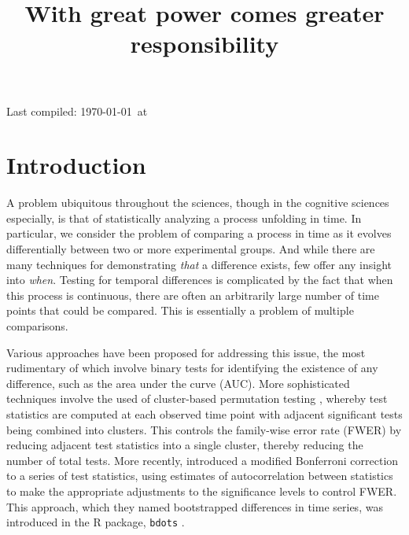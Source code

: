 \documentclass{article}
\title{With great power comes greater responsibility}
\date{}
\newcommand{\xt}{\texttt}
\begin{document}

\maketitle

Last compiled: \today \  at \currenttime


%


\section{Introduction}

A problem ubiquitous throughout the sciences, though in the cognitive sciences especially, is that of statistically analyzing a process unfolding in time. In particular, we consider the problem of comparing a process in time as it evolves differentially between two or more experimental groups. And while there are many techniques for demonstrating \textit{that} a difference exists, few offer any insight into \textit{when}. Testing for temporal differences is complicated by the fact that when this process is continuous, there are often an arbitrarily large number of time points that could be compared. This is essentially a problem of multiple comparisons.

Various approaches have been proposed for addressing this issue, the most rudimentary of which involve binary tests for identifying the existence of any difference, such as the area under the curve (AUC).  More sophisticated techniques involve the used of cluster-based permutation testing \citep{Maris2007}, whereby test statistics are computed at each observed time point with adjacent significant tests being combined into clusters. This controls the family-wise error rate (FWER) by reducing adjacent test statistics into a single cluster, thereby reducing the number of total tests. More recently, \citet{oleson2017detecting} introduced a modified Bonferroni correction to a series of test statistics, using estimates of autocorrelation between statistics to make the appropriate adjustments to the significance levels to control FWER. This approach, which they named bootstrapped differences in time series, was introduced in the R package, \xt{bdots} \citep{seedorff2018bdots}.
\end{document}
